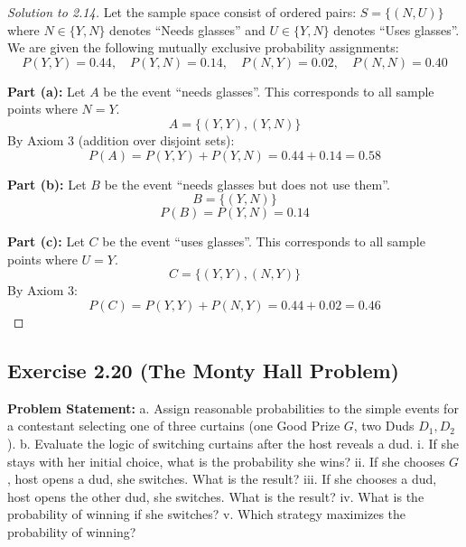 \documentclass[12pt]{article}
\begin{document}
\begin{proof}[Solution to 2.14]
Let the sample space consist of ordered pairs: $S = \{ (N, U) \}$ where $N \in \{Y, N\}$ denotes ``Needs glasses'' and $U \in \{Y, N\}$ denotes ``Uses glasses''. We are given the following mutually exclusive probability assignments:
\[ P(Y,Y) = 0.44, \quad P(Y,N) = 0.14, \quad P(N,Y) = 0.02, \quad P(N,N) = 0.40 \]

\textbf{Part (a):} Let $A$ be the event ``needs glasses''. This corresponds to all sample points where $N=Y$.
\[ A = \{ (Y,Y), (Y,N) \} \]
By Axiom 3 (addition over disjoint sets):
\[ P(A) = P(Y,Y) + P(Y,N) = 0.44 + 0.14 = 0.58 \]

\textbf{Part (b):} Let $B$ be the event ``needs glasses but does not use them''.
\[ B = \{ (Y,N) \} \]
\[ P(B) = P(Y,N) = 0.14 \]

\textbf{Part (c):} Let $C$ be the event ``uses glasses''. This corresponds to all sample points where $U=Y$.
\[ C = \{ (Y,Y), (N,Y) \} \]
By Axiom 3:
\[ P(C) = P(Y,Y) + P(N,Y) = 0.44 + 0.02 = 0.46 \]
\end{proof}

\subsection*{Exercise 2.20 (The Monty Hall Problem)}
\textbf{Problem Statement:} 
a. Assign reasonable probabilities to the simple events for a contestant selecting one of three curtains (one Good Prize $G$, two Duds $D_1, D_2$). 
b. Evaluate the logic of switching curtains after the host reveals a dud.
i. If she stays with her initial choice, what is the probability she wins?
ii. If she chooses $G$, host opens a dud, she switches. What is the result?
iii. If she chooses a dud, host opens the other dud, she switches. What is the result?
iv. What is the probability of winning if she switches?
v. Which strategy maximizes the probability of winning?
\end{document}
